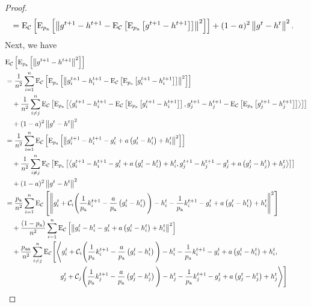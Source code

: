\documentclass{article}
\begin{document}
\begin{proof}
\begin{align*}
      &={\rm E}_{\mathcal{C}}\left[{\rm E}_{p_{\textnormal{a}}}\left[\left\| g^{t+1} - h^{t+1} - {\rm E}_{\mathcal{C}}\left[{\rm E}_{p_{\textnormal{a}}}\left[g^{t+1} - h^{t+1}\right]\right] \right\|^2\right]\right] + (1 - a)^2\left\| g^{t} - h^{t} \right\|^2.
  \end{align*}
  Next, we have
  \begin{align*}
    &\ExpSub{\cC}{\ExpSub{\probavailable}{\norm{g^{t+1} - h^{t+1}}^2}} \\
    &=\frac{1}{n^2}\sum_{i=1}^n\ExpSub{\cC}{\ExpSub{\probavailable}{\norm{g^{t+1}_i - h^{t+1}_i - \ExpSub{\cC}{\ExpSub{\probavailable}{g^{t+1}_i - h^{t+1}_i}}}^2}} \\
    &\quad +\frac{1}{n^2}\sum_{i \neq j}^n\ExpSub{\cC}{\ExpSub{\probavailable}{\inp{g^{t+1}_i - h^{t+1}_i - \ExpSub{\cC}{\ExpSub{\probavailable}{g^{t+1}_i - h^{t+1}_i}}}{g^{t+1}_j - h^{t+1}_j - \ExpSub{\cC}{\ExpSub{\probavailable}{g^{t+1}_j - h^{t+1}_j}}}}} \\
    &\quad + (1 - a)^2\norm{g^{t} - h^{t}}^2\\
    &=\frac{1}{n^2}\sum_{i=1}^n\ExpSub{\cC}{\ExpSub{\probavailable}{\norm{g^{t+1}_i - h^{t+1}_i - g^{t}_i + a \left(g^{t}_i - h^{t}_i\right) + h^{t}_i}^2}} \\
    &\quad +\frac{1}{n^2}\sum_{i \neq j}^n\ExpSub{\cC}{\ExpSub{\probavailable}{\inp{g^{t+1}_i - h^{t+1}_i - g^{t}_i + a \left(g^{t}_i - h^{t}_i\right) + h^{t}_i}{g^{t+1}_j - h^{t+1}_j - g^{t}_j + a \left(g^{t}_j - h^{t}_j\right) + h^{t}_j}}} \\
    &\quad + (1 - a)^2\norm{g^{t} - h^{t}}^2\\
    &=\frac{\probavailable}{n^2}\sum_{i=1}^n\ExpSub{\cC}{\norm{g^{t}_i + \cC_i\Bigg(\frac{1}{\probavailable}k^{t+1}_i - \frac{a}{\probavailable} \left(g^{t}_i - h^{t}_i\right)\Bigg) - h^{t}_i - \frac{1}{\probavailable}k^{t+1}_i - g^{t}_i + a \left(g^{t}_i - h^{t}_i\right) + h^{t}_i}^2} \\
    &\quad+ \frac{(1 - \probavailable)}{n^2}\sum_{i=1}^n\ExpSub{\cC}{\norm{g^{t}_i - h^{t}_i - g^{t}_i + a \left(g^{t}_i - h^{t}_i\right) + h^{t}_i}^2} \\
    &\quad +\frac{\probpairaa}{n^2}\sum_{i \neq j}^n{\rm E}_{\cC}\Bigg[\Bigg\langle g^{t}_i + \cC_i\Bigg(\frac{1}{\probavailable}k^{t+1}_i - \frac{a}{\probavailable} \left(g^{t}_i - h^{t}_i\right)\Bigg) - h^{t}_i - \frac{1}{\probavailable}k^{t+1}_i - g^{t}_i + a \left(g^{t}_i - h^{t}_i\right) + h^{t}_i, \\
    &\qquad\qquad\qquad\qquad g^{t}_j + \cC_j\Bigg(\frac{1}{\probavailable}k^{t+1}_j - \frac{a}{\probavailable}\left(g^{t}_j - h^{t}_j\right)\Bigg) - h^{t}_j - \frac{1}{\probavailable}k^{t+1}_j - g^{t}_j + a \left(g^{t}_j - h^{t}_j\right) + h^{t}_j\Bigg\rangle\Bigg] \\

\end{align*}
\end{proof}
\end{document}

